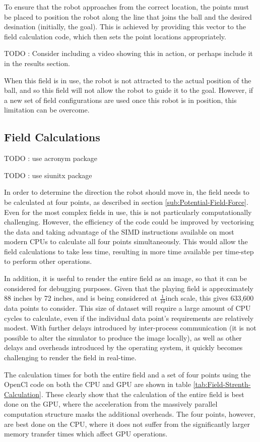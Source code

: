 \documentclass[10pt,british,english]{article}
\begin{document}
To ensure that the robot approaches from the correct location, the points must be placed to position the robot along the line that joins the ball and the desired desination (initially, the goal).  This is achieved by providing this vector to the field calculation code, which then sets the point locations appropriately.

TODO : Consider including a video showing this in action, or perhaps include it in the results section.

When this field is in use, the robot is not attracted to the actual position of the ball, and so this field will not allow the robot to guide it to the goal. However, if a new set of field configurations are used once this robot is in position, this limitation can be overcome.

\subsection{Field Calculations}

TODO : use acronym package

TODO : use siunitx package

In order to determine the direction the robot should move in, the field needs to be calculated at four points, as described in section \ref{sub:Potential-Field-Force}. Even for the most complex fields in use, this is not particularly computationally challenging. However, the efficiency of the code could be improved by vectorising the data and taking advantage of the \ac{SIMD} instructions available on most modern \acp{CPU} to calculate all four points simultaneously. This would allow the field calculations to take less time, resulting in more time available per time-step to perform other operations.

In addition, it is useful to render the entire field as an image, so that it can be considered for debugging purposes. Given that the playing field is approximately 88 inches by 72 inches, and is being considered at $\frac{1}{10}$inch scale, this gives 633,600 data points to consider. This size of dataset will require a large amount of CPU cycles to calculate, even if the individual data point's requirements are relatively modest. With further delays introduced by inter-process communication (it is not possible to alter the simulator to produce the image locally), as well as other delays and overheads introduced by the operating system, it quickly becomes challenging to render the field in real-time.

The calculation times for both the entire field and a set of four points using the OpenCl code on both the \ac{CPU} and \ac{GPU} are shown in table \ref{tab:Field-Strenth-Calculation}. These clearly show that the calculation of the entire field is best done on the GPU, where the acceleration from the massively parallel computation structure masks the additional overheads. The four points, however, are best done on the \ac{CPU}, where it does not suffer from the significantly larger memory transfer times which affect \ac{GPU} operations.
\end{document}

